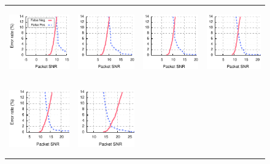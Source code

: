 \begin{figure}[p]
	\begin{leftfullpage}
	\centering
	
	\begin{tabular}{cccc}
	\includegraphics[height=1.2in]{figures/delivery_figures/goodbad/packet_snr_goodbad_0.pdf} &
	\includegraphics[height=1.2in]{figures/delivery_figures/goodbad/packet_snr_goodbad_1.pdf} &
	\includegraphics[height=1.2in]{figures/delivery_figures/goodbad/packet_snr_goodbad_2.pdf} &
	\includegraphics[height=1.2in]{figures/delivery_figures/goodbad/packet_snr_goodbad_3.pdf} \\
	\includegraphics[height=1.2in]{figures/delivery_figures/goodbad/packet_snr_goodbad_4.pdf} &
	\includegraphics[height=1.2in]{figures/delivery_figures/goodbad/packet_snr_goodbad_5.pdf} &

\end{tabular}
\end{leftfullpage}
\end{figure}
